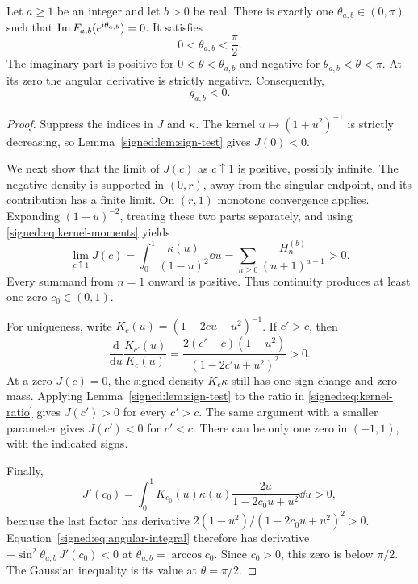 \begin{theorem}\label{signed:thm:unique-zero}
Let $a\ge1$ be an integer and let $b>0$ be real. There is exactly one
$\theta_{a,b}\in(0,\pi)$ such that
$\operatorname{Im} F_{a,b}(e^{\mathrm{i}\theta_{a,b}})=0$. It satisfies
\begin{equation}\label{signed:eq:zero-range}
 0<\theta_{a,b}<\frac\pi2.
\end{equation}
The imaginary part is positive for $0<\theta<\theta_{a,b}$ and negative for $\theta_{a,b}<\theta<\pi$. At its zero the angular derivative is strictly negative. Consequently,
\begin{equation}\label{signed:eq:g-negative}
 g_{a,b}<0.
\end{equation}
\end{theorem}
\begin{proof}
Suppress the indices in $J$ and $\kappa$. The kernel $u\mapsto(1+u^2)^{-1}$ is strictly decreasing, so Lemma~\ref{signed:lem:sign-test} gives $J(0)<0$.

We next show that the limit of $J(c)$ as $c\uparrow1$ is positive, possibly infinite. The negative density is supported in $(0,r)$, away from the singular endpoint, and its contribution has a finite limit. On $(r,1)$ monotone convergence applies. Expanding $(1-u)^{-2}$, treating these two parts separately, and using \eqref{signed:eq:kernel-moments} yields
\begin{equation}\label{signed:eq:J-at-one}
 \lim_{c\uparrow1}J(c)
 =\int_0^1\frac{\kappa(u)}{(1-u)^2}\dd u
 =\sum_{n\ge0}\frac{H_n^{(b)}}{(n+1)^{a-1}}>0.
\end{equation}
Every summand from $n=1$ onward is positive. Thus continuity produces at least one zero $c_0\in(0,1)$.

For uniqueness, write $K_c(u)=(1-2cu+u^2)^{-1}$. If $c'>c$, then
\begin{equation}\label{signed:eq:kernel-ratio}
 \frac{\mathrm d}{\mathrm du}\frac{K_{c'}(u)}{K_c(u)}
 =\frac{2(c'-c)(1-u^2)}{(1-2c'u+u^2)^2}>0.
\end{equation}
At a zero $J(c)=0$, the signed density $K_c\kappa$ still has one sign change and zero mass. Applying Lemma~\ref{signed:lem:sign-test} to the ratio in \eqref{signed:eq:kernel-ratio} gives $J(c')>0$ for every $c'>c$. The same argument with a smaller parameter gives $J(c')<0$ for $c'<c$. There can be only one zero in $(-1,1)$, with the indicated signs.

Finally,
\[
 J'(c_0)=\int_0^1 K_{c_0}(u)\kappa(u)
        \frac{2u}{1-2c_0u+u^2}\dd u>0,
\]
because the last factor has derivative $2(1-u^2)/(1-2c_0u+u^2)^2>0$. Equation~\eqref{signed:eq:angular-integral} therefore has derivative
$-\sin^2\theta_{a,b}\,J'(c_0)<0$ at $\theta_{a,b}=\arccos c_0$. Since $c_0>0$, this zero is below $\pi/2$. The Gaussian inequality is its value at $\theta=\pi/2$.
\end{proof}

